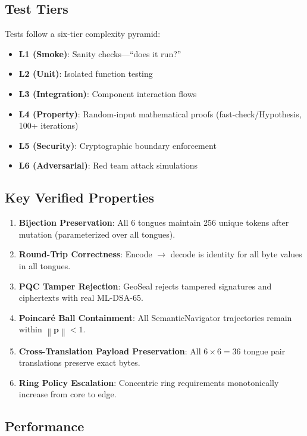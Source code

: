 \documentclass[11pt,a4paper]{article}
\newcommand{\norm}[1]{\left\|#1\right\|}
\begin{document}
\subsection{Test Tiers}

Tests follow a six-tier complexity pyramid:

\begin{itemize}
  \item \textbf{L1 (Smoke)}: Sanity checks---``does it run?''
  \item \textbf{L2 (Unit)}: Isolated function testing
  \item \textbf{L3 (Integration)}: Component interaction flows
  \item \textbf{L4 (Property)}: Random-input mathematical proofs
        (fast-check/Hypothesis, 100+ iterations)
  \item \textbf{L5 (Security)}: Cryptographic boundary enforcement
  \item \textbf{L6 (Adversarial)}: Red team attack simulations
\end{itemize}

\subsection{Key Verified Properties}

\begin{enumerate}
  \item \textbf{Bijection Preservation}: All 6 tongues maintain
        256 unique tokens after mutation (parameterized over all tongues).
  \item \textbf{Round-Trip Correctness}: Encode $\to$ decode is
        identity for all byte values in all tongues.
  \item \textbf{PQC Tamper Rejection}: GeoSeal rejects tampered
        signatures and ciphertexts with real ML-DSA-65.
  \item \textbf{Poincar\'{e} Ball Containment}: All SemanticNavigator
        trajectories remain within $\norm{\mathbf{p}} < 1$.
  \item \textbf{Cross-Translation Payload Preservation}: All
        $6 \times 6 = 36$ tongue pair translations preserve exact bytes.
  \item \textbf{Ring Policy Escalation}: Concentric ring requirements
        monotonically increase from core to edge.
\end{enumerate}

\subsection{Performance}
\end{document}
